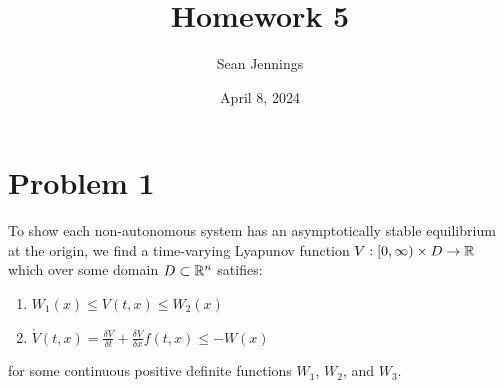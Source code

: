\documentclass{homework}
\title{Homework 5}
\author{Sean Jennings}
\date{April 8, 2024}
\begin{document}
\maketitle

\section{Problem 1}

To show each non-autonomous system has an asymptotically stable equilibrium
at the origin, we find a time-varying Lyapunov function
$V: [0, \infty) \times D \to \mathbb{R}$ which over some domain $D \subset \mathbb{R}^n$ satifies:
\begin{enumerate}
    \item $W_1(x) \leq V(t, x) \leq W_2(x)$
    \item $\dot{V}(t, x) = \frac{\delta V}{\delta t} +
        \frac{\delta V}{\delta x}f(t, x) \leq -W(x)$
\end{enumerate}
for some continuous positive definite functions $W_1$, $W_2$, and $W_3$.
\end{document}

